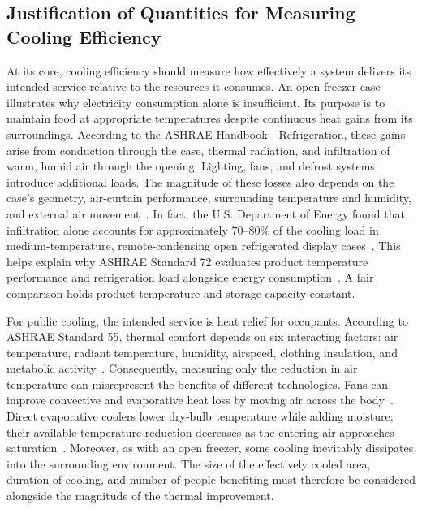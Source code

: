 \vspace{8 pt}

\subsection{Justification of Quantities for Measuring Cooling Efficiency}
At its core, cooling efficiency should measure how effectively a system delivers its intended service relative to the resources it consumes. An open freezer case illustrates why electricity consumption alone is insufficient. Its purpose is to maintain food at appropriate temperatures despite continuous heat gains from its surroundings. According to the ASHRAE Handbook—Refrigeration, these gains arise from conduction through the case, thermal radiation, and infiltration of warm, humid air through the opening. Lighting, fans, and defrost systems introduce additional loads. The magnitude of these losses also depends on the case's geometry, air-curtain performance, surrounding temperature and humidity, and external air movement~\cite{ashrae_refrigeration_2022}. In fact, the U.S. Department of Energy found that infiltration alone accounts for approximately 70–80\% of the cooling load in medium-temperature, remote-condensing open refrigerated display cases~\cite{doe_display_cases_2013}. This helps explain why ASHRAE Standard 72 evaluates product temperature performance and refrigeration load alongside energy consumption~\cite{ashrae72_2022_scope}. A fair comparison holds product temperature and storage capacity constant.

For public cooling, the intended service is heat relief for occupants. According to ASHRAE Standard 55, thermal comfort depends on six interacting factors: air temperature, radiant temperature, humidity, airspeed, clothing insulation, and metabolic activity~\cite{ashrae55_2023_scope}. Consequently, measuring only the reduction in air temperature can misrepresent the benefits of different technologies. Fans can improve convective and evaporative heat loss by moving air across the body~\cite{cbe_fans_2023}. Direct evaporative coolers lower dry-bulb temperature while adding moisture; their available temperature reduction decreases as the entering air approaches saturation~\cite{pnnl_evaporative}. Moreover, as with an open freezer, some cooling inevitably dissipates into the surrounding environment. The size of the effectively cooled area, duration of cooling, and number of people benefiting must therefore be considered alongside the magnitude of the thermal improvement.

